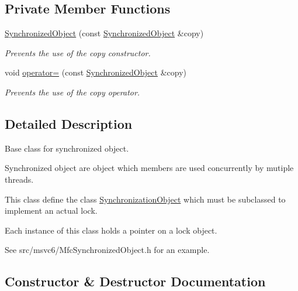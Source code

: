 \subsection*{Private Member Functions}
\begin{DoxyCompactItemize}
\item 
\hyperlink{class_synchronized_object_abd5710f9d640c68685835e2a5e15b6bc}{Synchronized\+Object} (const \hyperlink{class_synchronized_object}{Synchronized\+Object} \&copy)\hypertarget{class_synchronized_object_abd5710f9d640c68685835e2a5e15b6bc}{}\label{class_synchronized_object_abd5710f9d640c68685835e2a5e15b6bc}

\begin{DoxyCompactList}\small\item\em Prevents the use of the copy constructor. \end{DoxyCompactList}\item 
void \hyperlink{class_synchronized_object_af555e5afee40975c212831d0e5aee070}{operator=} (const \hyperlink{class_synchronized_object}{Synchronized\+Object} \&copy)\hypertarget{class_synchronized_object_af555e5afee40975c212831d0e5aee070}{}\label{class_synchronized_object_af555e5afee40975c212831d0e5aee070}

\begin{DoxyCompactList}\small\item\em Prevents the use of the copy operator. \end{DoxyCompactList}\end{DoxyCompactItemize}


\subsection{Detailed Description}
Base class for synchronized object. 

Synchronized object are object which members are used concurrently by mutiple threads.

This class define the class \hyperlink{class_synchronized_object_1_1_synchronization_object}{Synchronization\+Object} which must be subclassed to implement an actual lock.

Each instance of this class holds a pointer on a lock object.

See src/msvc6/\+Mfc\+Synchronized\+Object.\+h for an example. 

\subsection{Constructor \& Destructor Documentation}

